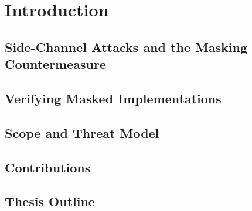 \setlength{\parindent}{0pt}
\chapter{Introduction}
\section{Side-Channel Attacks and the Masking Countermeasure}
\section{Verifying Masked Implementations}
\section{Scope and Threat Model} 
\section{Contributions}
\section{Thesis Outline}
